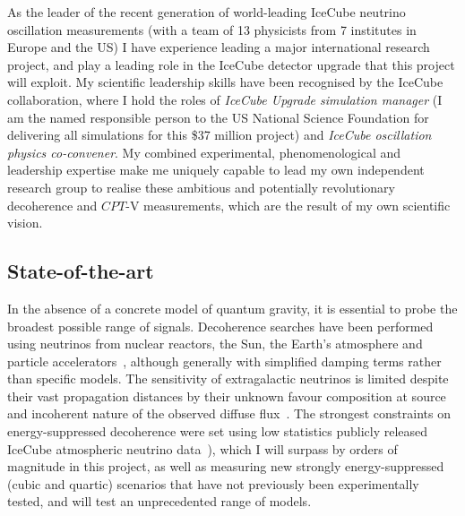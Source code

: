 \documentclass[a4paper,11pt]{article}
\begin{document}
As the leader of the recent generation of world-leading IceCube neutrino oscillation measurements (with a team of 13 physicists from 7 institutes in Europe and the US) I have experience leading a major international research project, and play a leading role in the IceCube detector upgrade that this project will exploit. My scientific leadership skills have been recognised by the IceCube collaboration, where I hold the roles of \textit{IceCube Upgrade simulation manager} (I am the named responsible person to the US National Science Foundation for delivering all simulations for this \$37 million project) and \textit{IceCube oscillation physics co-convener}. My combined experimental, phenomenological and leadership expertise make me uniquely capable to lead my own independent research group to realise these ambitious and potentially revolutionary decoherence and $CPT$-V measurements, which are the result of my own scientific vision. \\


\subsection{State-of-the-art}

In the absence of a concrete model of quantum gravity, it is essential to probe the broadest possible range of signals. Decoherence searches have been performed using neutrinos from nuclear reactors, the Sun, the Earth's atmosphere and particle accelerators~\cite{PhysRevLett.85.1166, Abbasi:2009nfa, PhysRevD.89.053002, Bakhti:2015dca, Coelho:2017zes, PhysRevD.95.113005, Coloma:2018idr, de_Holanda_2020}, although generally with simplified damping terms rather than specific models. The sensitivity of extragalactic neutrinos is limited despite their vast propagation distances by their unknown favour composition at source and incoherent nature of the observed diffuse flux~\cite{PhysRevD.102.115003}. The strongest constraints on energy-suppressed decoherence were set using low statistics publicly released IceCube atmospheric neutrino data~\cite{Coloma:2018idr}), which I will surpass by orders of magnitude in this project, as well as measuring new strongly energy-suppressed (cubic and quartic) scenarios that have not previously been experimentally tested, and will test an unprecedented range of models.
\end{document}
